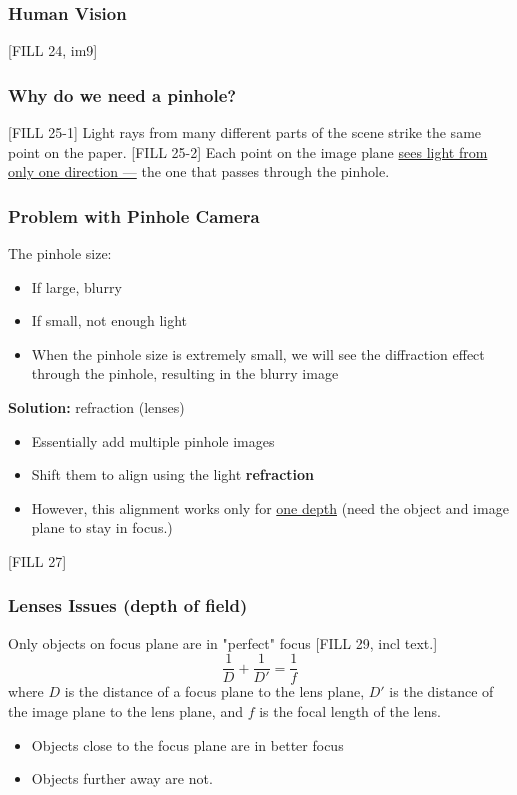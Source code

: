\documentclass[10pt]{article}
\begin{document}
\subsubsection*{Human Vision}
[FILL 24, im9]

\subsubsection*{Why do we need a pinhole?}
[FILL 25-1]
Light rays from many different parts of the scene strike the same point on the paper.
[FILL 25-2]
Each point on the image plane \underline{sees light from only one direction ---} the one that passes through the pinhole.

\subsubsection*{Problem with Pinhole Camera}
The pinhole size:
\begin{itemize}
	\item If large, blurry
	\item If small, not enough light
	\item When the pinhole size is extremely small, we will see the diffraction effect through the pinhole, resulting in the blurry image
\end{itemize}
\textbf{Solution:} refraction (lenses)
\begin{itemize}
	\item Essentially add multiple pinhole images
	\item Shift them to align using the light \textbf{refraction}
	\item However, this alignment works only for \underline{one depth} (need the object and image plane to stay in focus.)
\end{itemize}
[FILL 27]

\subsubsection*{Lenses Issues (depth of field)}
Only objects on focus plane are in "perfect" focus
[FILL 29, incl text.]
\[\frac{1}{D} + \frac{1}{D'} = \frac{1}{f}\]
where $D$ is the distance of a focus plane to the lens plane, $D'$ is the distance of the image plane to the lens plane, and $f$ is the focal length of the lens.
\begin{itemize}
	\item Objects close to the focus plane are in better focus
	\item Objects further away are not.
\end{itemize}
\end{document}
